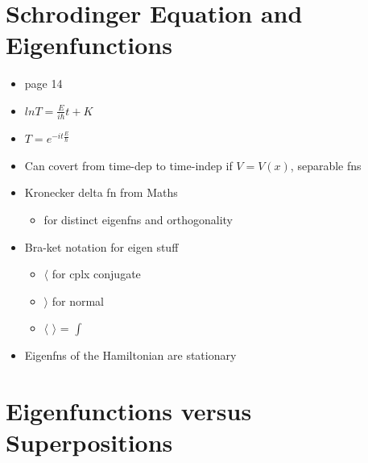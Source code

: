 \documentclass[a4paper,11pt,normalem]{article}
\begin{document}
\section{Schrodinger Equation and Eigenfunctions}\label{schrodinger-equation-and-eigenfunctions}

\begin{itemize}
\item
  page 14
\item
  \(ln T = \frac{E}{i\hbar}t + K\)
\item
  \(T = e^{-it\frac{E}{\hbar}}\)
\item
  Can covert from time-dep to time-indep if \(V = V(x)\), separable fns
\item
  Kronecker delta fn from Maths
  \begin{itemize}
  \item
    for distinct eigenfns and orthogonality
  \end{itemize}
\item
  Bra-ket notation for eigen stuff
  \begin{itemize}
  \item
    \(\langle\) \textbar{} for cplx conjugate
  \item
    \textbar{} \(\rangle\) for normal
  \item
    \(\langle\) \textbar{} \(\rangle\) = \(\int\)
  \end{itemize}
\item
  Eigenfns of the Hamiltonian are stationary
\end{itemize}

\section{Eigenfunctions versus Superpositions}\label{eigenfunctions-versus-superpositions}
\end{document}
